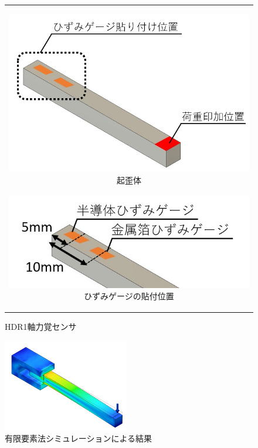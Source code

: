 \begin{figure}[b]
  \centering
  \begin{tabular}{c}
    \begin{minipage}{0.5\hsize}
      \begin{center}
        \includegraphics[scale=0.2]{pic/hari.jpg}
        \hspace{1.cm} 
        \footnotesize{起歪体}
      \end{center}
    \end{minipage}
        \begin{minipage}{0.51\hsize}
      \begin{center}
        \includegraphics[scale=0.29]{pic/hizumi.jpg}
        \hspace{1.6cm} 
        \footnotesize{ひずみゲージの貼付位置}
      \end{center}
    \end{minipage}
  \end{tabular}
  \caption[]{HDR1軸力覚センサ}\label{sensor}
\end{figure}

\begin{figure}[h]
  \begin{center}
    \includegraphics[width=5.5cm]{pic/simHizumi.jpg}
    \caption{有限要素法シミュレーションによる結果}\label{fig:sim}
  \end{center}
\end{figure}

